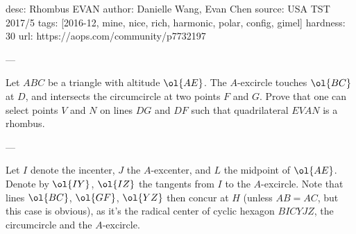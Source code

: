 desc: Rhombus EVAN
author: Danielle Wang, Evan Chen
source: USA TST 2017/5
tags: [2016-12, mine, nice, rich, harmonic, polar, config, gimel]
hardness: 30
url: https://aops.com/community/p7732197

---

Let $ABC$ be a triangle with altitude $\ol{AE}$.
The $A$-excircle touches $\ol{BC}$ at $D$,
and intersects the circumcircle at two points $F$ and $G$.
Prove that one can select points $V$ and $N$
on lines $DG$ and $DF$ such that quadrilateral $EVAN$ is a rhombus.

---

Let $I$ denote the incenter, $J$ the $A$-excenter,
and $L$ the midpoint of $\ol{AE}$.
Denote by $\ol{IY}$, $\ol{IZ}$ the tangents
from $I$ to the $A$-excircle.
Note that lines $\ol{BC}$, $\ol{GF}$, $\ol{YZ}$ then concur at $H$
(unless $AB=AC$, but this case is obvious),
as it's the radical center of cyclic hexagon $BICYJZ$,
the circumcircle and the $A$-excircle.

